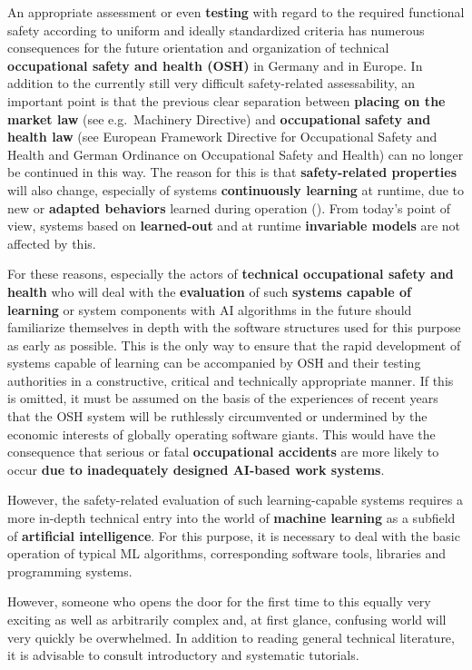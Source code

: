 \documentclass [oneside,10pt,a4paper,ngerman,BCOR10mm,headsepline,parindent,final]{scrartcl}
\begin{document}
An appropriate assessment or even \textbf{testing} with regard to the
required functional safety according to uniform and ideally standardized
criteria has numerous consequences for the future orientation and
organization of technical \textbf{occupational safety and health (OSH)}
in Germany and in Europe. In addition to the currently still very
difficult safety-related assessability, an important point is that the
previous clear separation between \textbf{placing on the market law}
(see e.g.~Machinery Directive) and \textbf{occupational safety and
health law} (see European Framework Directive for Occupational Safety
and Health and German Ordinance on Occupational Safety and Health) can
no longer be continued in this way. The reason for this is that
\textbf{safety-related properties} will also change, especially of
systems \textbf{continuously learning} at runtime, due to new or
\textbf{adapted behaviors} learned during operation
(\cite{BAuA_Rechtsgutachten_KI_2021}). From today's point of view,
systems based on \textbf{learned-out} and at runtime \textbf{invariable
models} are not affected by this.

For these reasons, especially the actors of \textbf{technical
occupational safety and health} who will deal with the
\textbf{evaluation} of such \textbf{systems capable of learning} or
system components with AI algorithms in the future should familiarize
themselves in depth with the software structures used for this purpose
as early as possible. This is the only way to ensure that the rapid
development of systems capable of learning can be accompanied by OSH and
their testing authorities in a constructive, critical and technically
appropriate manner. If this is omitted, it must be assumed on the basis
of the experiences of recent years that the OSH system will be
ruthlessly circumvented or undermined by the economic interests of
globally operating software giants. This would have the consequence that
serious or fatal \textbf{occupational accidents} are more likely to
occur \textbf{due to inadequately designed AI-based work systems}.

However, the safety-related evaluation of such learning-capable systems
requires a more in-depth technical entry into the world of
\textbf{machine learning} as a subfield of \textbf{artificial
intelligence}. For this purpose, it is necessary to deal with the basic
operation of typical ML algorithms, corresponding software tools,
libraries and programming systems.

However, someone who opens the door for the first time to this equally
very exciting as well as arbitrarily complex and, at first glance,
confusing world will very quickly be overwhelmed. In addition to reading
general technical literature, it is advisable to consult introductory
and systematic tutorials.
\end{document}
